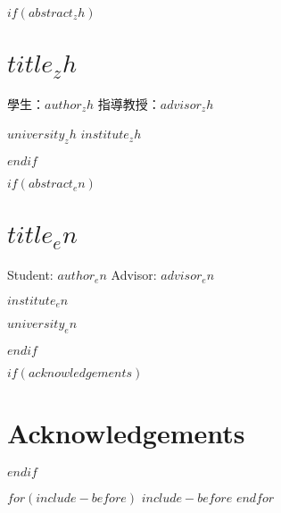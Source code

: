 \documentclass[$if(fontsize)$$fontsize$,$endif$$if(lang)$$babel-lang$,$endif$$if(papersize)$$papersize$paper,$endif$$for(classoption)$$classoption$$sep$,$endfor$]{$documentclass$}
\def\LARGE{\fontsize{20}{30}\selectfont}%
\begin{document}
\newcommand\frontmatter{
    \cleardoublepage
    \pagenumbering{roman}
}

\newcommand\mainmatter{
    \cleardoublepage
    \pagenumbering{arabic}
}

\newcommand\backmatter{
    \if@openright
        \cleardoublepage
    \else
        \clearpage
    \fi
}

\frontmatter

$if(abstract_zh)$
\renewcommand{\abstractname}{\LARGE \center 中文摘要}
\chapter*{$title_zh$}
\vspace{1.5cm}
\centerline{學生：$author_zh$ \hfill 指導教授：$advisor_zh$}
\vspace{1.5cm}
\centerline{$university_zh$ $institute_zh$}
\vspace{2cm}
\centerline{\fontsize{20}{30}\selectfont{摘要}}
\vspace{1cm}
\fontsize{14}{21}\selectfont{$abstract_zh$}
$endif$

$if(abstract_en)$
\renewcommand{\abstractname}{\LARGE \center Abstract}
\chapter*{$title_en$}
\vspace{1.5cm}
\centerline{Student: $author_en$ \hfill Advisor: $advisor_en$}
\vspace{1.5cm}
\centerline{$institute_en$}
\centerline{$university_en$}
\vspace{2cm}
\centerline{\fontsize{20}{30}}
\vspace{1cm}
\fontsize{14}{21}\selectfont{$abstract_en$}
$endif$

$if(acknowledgements)$
\renewcommand{\abstractname}{\LARGE \center Acknowledgements}
\chapter*{Acknowledgements}
\fontsize{14}{21}\selectfont{$acknowledgements$}
$endif$

$for(include-before)$
$include-before$
$endfor$
\end{document}
